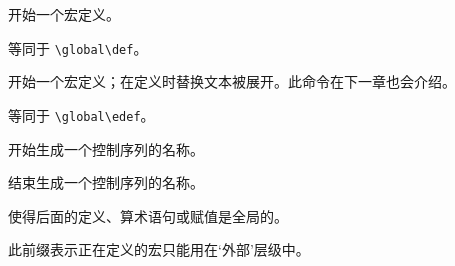 \documentclass[letterpaper]{book}
\begin{document}
\label{cschap:def}\label{cschap:gdef}\label{cschap:edef}\label{cschap:xdef}
\label{cschap:csname}\label{cschap:endcsname}\label{cschap:global2}
\label{cschap:outer}\label{cschap:long}\label{cschap:let}\label{cschap:futurelet}
\begin{inventory}
\item [\cs{def}] 
      开始一个宏定义。

\item [\cs{gdef}] 
      等同于 \verb-\global\def-。

\item [\cs{edef}] 
      开始一个宏定义；在定义时替换文本被展开。此命令在下一章也会介绍。 

\item [\cs{xdef}] 
      等同于 \verb-\global\edef-。

\item [\cs{csname}] 
      开始生成一个控制序列的名称。

\item [\cs{endcsname}] 
      结束生成一个控制序列的名称。

\item [\cs{global}] 
      使得后面的定义、算术语句或赋值是全局的。

\item [\cs{outer}] 
      此前缀表示正在定义的宏只能用在`外部'层级中。


\end{inventory}
\end{document}
